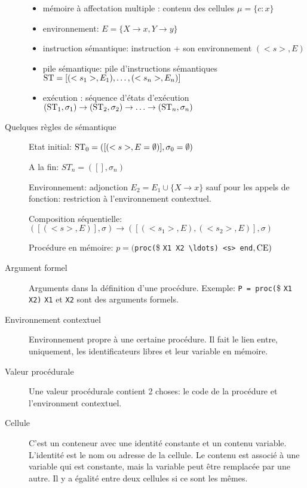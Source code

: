 \begin{description}
\begin{itemize}
      \item mémoire à affectation multiple : contenu des cellules
        $\mu = \{c:x\}$

      \item environnement:
        $E= \{ X\rightarrow x, Y \rightarrow y\}$

      \item instruction sémantique: instruction + son environnement
        $(<s>,E)$

      \item pile sémantique: pile d'instructions sémantiques
        $\mathrm{ST}=[(<s_1>,E_1), \ldots, (<s_n>,E_n)]$

      \item exécution : séquence d'états d'exécution
        $(\mathrm{ST}_1,\sigma_1)\rightarrow(\mathrm{ST}_2,\sigma_2)\rightarrow
        \ldots \rightarrow(\mathrm{ST}_n,\sigma_n)$
    \end{itemize}

  \item[Quelques règles de sémantique]

    Etat initial: $\mathrm{ST}_0 =([(<s>,E=\emptyset)],\sigma_0=\emptyset)$

    A la fin: $ST_n =([],\sigma_n)$

    Environnement: adjonction $E_2 = E_1 \cup \{X\rightarrow x\}$
    sauf pour les appels de fonction: restriction à l'environnement contextuel.

    Composition séquentielle: $([(<s>,E)],\sigma)
    \rightarrow ([(<s_1>,E),(<s_2>,E)],\sigma)$

    Procédure en mémoire:
    $p = ($\lstinline|proc(|\$ \lstinline|X1 X2 \ldots) <s> end|$, \mathrm{CE})$

  \item[Argument formel]
    Arguments dans la définition d'une procédure.
    Exemple:
    \lstinline|P = proc(|\$ \lstinline|X1 X2)|
    \lstinline|X1| et \lstinline|X2| sont des arguments formels.

  \item[Environnement contextuel]
    Environnement propre à une certaine procédure.
    Il fait le lien entre, uniquement,
    les identificateurs libres et leur variable en mémoire.

  \item[Valeur procédurale]
    Une valeur procédurale contient 2 choses: le code de la procédure
    et l'environment contextuel.

  \item[Cellule]
    C'est un conteneur avec une identité constante et un contenu variable.
    L'identité est le nom ou adresse de la cellule.
    Le contenu est associé à une variable qui est constante,
    mais la variable peut être remplacée par une autre.
    Il y a égalité entre deux cellules si ce sont les mêmes.


\end{description}
